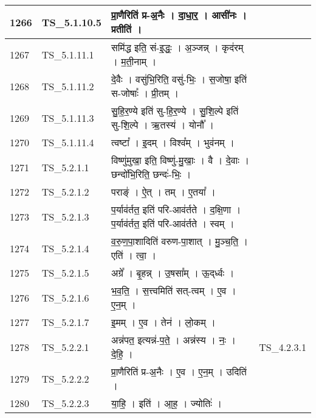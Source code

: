 \documentclass[17pt]{extarticle}
\begin{document}
\begin{longtable}{||p{0.4in}||p{0.9in}||p{4.0in}||p{0.9in}||}
        \hline
            1266 & TS\_5.1.10.5 & प्रा॒णैरिति॑ प्र{-}अ॒नैः   ।   दा॒धा॒र॒   ।   आसी॑नः   ।   प्रतीति॑   ।    &      \\
        \hline
            1267 & TS\_5.1.11.1 & समि॑द्ध इति॒ सं{-}इ॒द्धः॒   ।   अ॒ञ्जन्न्   ।   कृद॑रम्   ।   म॒ती॒नाम्   ।    &      \\
        \hline
            1268 & TS\_5.1.11.2 & दे॒वैः   ।   वसु॑भि॒रिति॒ वसु॑{-}भिः॒   ।   स॒जोषा॒ इति॑ स{-}जोषाः᳚   ।   प्री॒तम्   ।    &      \\
        \hline
            1269 & TS\_5.1.11.3 & सु॒हि॒र॒ण्ये इति॑ सु{-}हि॒र॒ण्ये   ।   सु॒शि॒ल्पे इति॑ सु{-}शि॒ल्पे   ।   ऋ॒तस्य॑   ।   योनौ᳚   ।    &      \\
        \hline
            1270 & TS\_5.1.11.4 & त्वष्टा᳚   ।   इ॒दम्   ।   विश्व᳚म्   ।   भुव॑नम्   ।    &      \\
        \hline
            1271 & TS\_5.2.1.1 & विष्णु॑मुखा॒ इति॒ विष्णु॑{-}मु॒खाः॒   ।   वै   ।   दे॒वाः   ।   छन्दो॑भि॒रिति॒ छन्दः॑{-}भिः॒   ।    &      \\
        \hline
            1272 & TS\_5.2.1.2 & पराङ्॑   ।   ऐ॒त्   ।   तम्   ।   ए॒तया᳚   ।    &      \\
        \hline
            1273 & TS\_5.2.1.3 & प॒र्याव॑र्तत॒ इति॑ परि{-}आव॑र्तते   ।   द॒क्षि॒णा   ।   प॒र्याव॑र्तत॒ इति॑ परि{-}आव॑र्तते   ।   स्वम्   ।    &      \\
        \hline
            1274 & TS\_5.2.1.4 & व॒रु॒ण॒पा॒शादिति॑ वरुण{-}पा॒शात्   ।   मु॒ञ्च॒ति॒   ।   एति॑   ।   त्वा॒   ।    &      \\
        \hline
            1275 & TS\_5.2.1.5 & अग्रे᳚   ।   बृ॒हन्न्   ।   उ॒षसा᳚म्   ।   ऊ॒द्‌र्ध्वः   ।    &      \\
        \hline
            1276 & TS\_5.2.1.6 & भ॒व॒ति॒   ।   स॒त्त्वमिति॑ सत्{-}त्वम्   ।   ए॒व   ।   ए॒न॒म्   ।    &      \\
        \hline
            1277 & TS\_5.2.1.7 & इ॒मम्   ।   ए॒व   ।   तेन॑   ।   लो॒कम्   ।    &      \\
        \hline
            1278 & TS\_5.2.2.1 & अन्न॑पत॒ इत्यन्न॑{-}प॒ते॒   ।   अन्न॑स्य   ।   नः॒   ।   दे॒हि॒   ।    & TS\_4.2.3.1        \\
        \hline
            1279 & TS\_5.2.2.2 & प्रा॒णैरिति॑ प्र{-}अ॒नैः   ।   ए॒व   ।   ए॒न॒म्   ।   उदिति॑   ।    &      \\
        \hline
            1280 & TS\_5.2.2.3 & या॒हि॒   ।   इति॑   ।   आ॒ह॒   ।   ज्योतिः॑   ।    &      \\
        \hline

\end{longtable}
\end{document}
